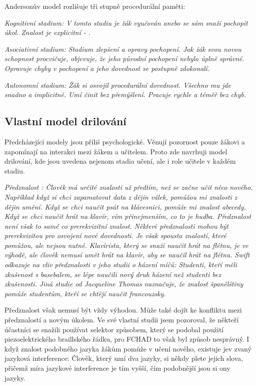 Andersonův model rozlišuje tři stupně procedurální paměti:

\em Kognitivní stadium\em : V tomto stadiu je žák vyučován anebo se sám snaží pochopit úkol.  Znalost je explicitní - .

\em Asociativní stadium\em : Stadium zlepšení a opravy pochopení.  Jak žák svou novou schopnost procvičuje, objevuje, že jeho původní pochopení nebylo úplně správné.  Opravuje chyby v pochopení a jeho dovednost se postupně zdokonalí.

\em Autonomní stadium\em : Žák si osvojil procedurální dovednost. Všechno mu jde snadno a implicitně.  Umí činit bez přemýšlení. Pracuje rychle a téměř bez chyb\citep{o1987some}.

\subsection{Vlastní model drilování}

Předcházející modely jsou příliš psychologické.  Věnují pozornost pouze žákovi a zapomínají na interakci mezi žákem a učitelem.  Proto zde navrhuji model drilování, kde jsou uvedena nejenom stadia učení, ale i role učitele v každém stadiu.

\em Předznalost \em : Člověk má určité znalosti už předtím, než se začne učit něco nového. Například když si chci zapamatovat data z dějin válek, pomůžou mi znalosti z dějin umění.  Když se chci naučit psát na klávesnici, pomůže mi znalost abecedy. Když se chci naučit hrát na klavír, vím přinejmenším, co to je hudba.  Předznalost není však to samé co prerekvizitní znalost.  Některé předznalosti mohou být prerekvizitou pro osvojení nové dovednosti. Je však spousta znalostí, které pomůžou, ale nejsou nutné.  Klavírista, který se snaží naučit hrát na flétnu, je ve výhodě, ale člověk nemusí umět hrát na klavír, aby se naučil hrát na flétnu.  Swift odkazuje na vliv předznalosti v jeho studii o házení míčů: Studenti, kteří měli zkušenost s basebalem, se lépe naučili nový druh házení než studenti bez zkušenosti. Jiná studie od Jacqueline Thomas naznačuje, že znalost španělštiny pomůže studentům, kteří se chtějí naučit francouzsky\citep{swift1903studies,thomas1988role}.

Předznalost však nemusí být vždy výhodou. Může také dojít ke konfliktu mezi předznalostí a novým úkolem. Ve své vlastní studii jsem pozoroval, že někteří účastníci se snažili používat selektor způsobem, který se podobal použití piezoelektrického braillského řádku, pro FCHAD to však byl způsob nesprávný.  I když znalost podobného jazyka žákům pomůže v učení nového, existuje jev zvaný jazyková interference: Člověk, který umí dva jazyky, si někdy plete jejich slova, přičemž míra jazykové interference je tím vyšší, čím podobnější jsou si ony jazyky\citep{brauer1998stroop}.

